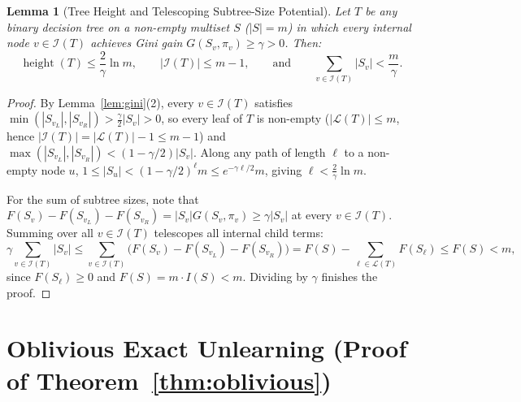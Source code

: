 \documentclass[11pt]{article}
\newtheorem{lemma}{Lemma}
\theoremstyle{definition}
\newcommand{\calI}{\mathcal{I}}
\newcommand{\calL}{\mathcal{L}}
\begin{document}
\begin{lemma}[Tree Height and Telescoping Subtree-Size Potential]
\label{lem:potential}
Let $T$ be any binary decision tree on a non-empty multiset $S$ ($|S| = m$) in which every internal node $v \in \calI(T)$ achieves Gini gain $G(S_v, \pi_v) \ge \gamma > 0$. Then:
\[
    \operatorname{height}(T) \le \frac{2}{\gamma} \ln m, \qquad |\calI(T)| \le m - 1, \qquad \text{and} \qquad \sum_{v \in \calI(T)} |S_v| < \frac{m}{\gamma}.
\]
\end{lemma}

\begin{proof}
By Lemma~\ref{lem:gini}(2), every $v \in \calI(T)$ satisfies $\min(|S_{v_L}|, |S_{v_R}|) > \frac{\gamma}{2}|S_v| > 0$, so every leaf of $T$ is non-empty ($|\calL(T)| \le m$, hence $|\calI(T)| = |\calL(T)| - 1 \le m - 1$) and $\max(|S_{v_L}|, |S_{v_R}|) < (1 - \gamma/2)|S_v|$. Along any path of length $\ell$ to a non-empty node $u$, $1 \le |S_u| < (1 - \gamma/2)^\ell m \le e^{-\gamma \ell / 2} m$, giving $\ell < \frac{2}{\gamma}\ln m$.

For the sum of subtree sizes, note that $F(S_v) - F(S_{v_L}) - F(S_{v_R}) = |S_v| G(S_v, \pi_v) \ge \gamma |S_v|$ at every $v \in \calI(T)$. Summing over all $v \in \calI(T)$ telescopes all internal child terms:
\[
    \gamma \sum_{v \in \calI(T)} |S_v| \le \sum_{v \in \calI(T)} \big(F(S_v) - F(S_{v_L}) - F(S_{v_R})\big) = F(S) - \sum_{\ell \in \calL(T)} F(S_\ell) \le F(S) < m,
\]
since $F(S_\ell) \ge 0$ and $F(S) = m \cdot I(S) < m$. Dividing by $\gamma$ finishes the proof.
\end{proof}

\section{Oblivious Exact Unlearning (Proof of Theorem~\ref{thm:oblivious})}
\end{document}
